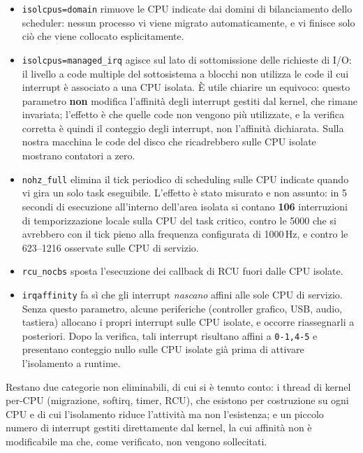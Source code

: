 \documentclass[11pt,a4paper]{article}
\begin{document}
\begin{itemize}
\item \texttt{isolcpus=domain} rimuove le CPU indicate dai domini di bilanciamento dello
scheduler: nessun processo vi viene migrato automaticamente, e vi finisce solo ci\`o che viene
collocato esplicitamente.

\item \texttt{isolcpus=managed\_irq} agisce sul lato di sottomissione delle richieste di I/O: il
livello a code multiple del sottosistema a blocchi non utilizza le code il cui interrupt \`e
associato a una CPU isolata. \`E utile chiarire un equivoco: questo parametro \textbf{non} modifica
l'affinit\`a degli interrupt gestiti dal kernel, che rimane invariata; l'effetto \`e che quelle
code non vengono pi\`u utilizzate, e la verifica corretta \`e quindi il conteggio degli interrupt,
non l'affinit\`a dichiarata. Sulla nostra macchina le code del disco che ricadrebbero sulle CPU
isolate mostrano contatori a zero.

\item \texttt{nohz\_full} elimina il tick periodico di scheduling sulle CPU indicate quando vi
gira un solo task eseguibile. L'effetto \`e stato misurato e non assunto: in 5 secondi di
esecuzione all'interno dell'area isolata si contano \textbf{106} interruzioni di temporizzazione
locale sulla CPU del task critico, contro le 5000 che si avrebbero con il tick pieno alla
frequenza configurata di 1000\,Hz, e contro le 623--1216 osservate sulle CPU di servizio.

\item \texttt{rcu\_nocbs} sposta l'esecuzione dei callback di RCU fuori dalle CPU isolate.

\item \texttt{irqaffinity} fa s\`i che gli interrupt \emph{nascano} affini alle sole CPU di
servizio. Senza questo parametro, alcune periferiche (controller grafico, USB, audio, tastiera)
allocano i propri interrupt sulle CPU isolate, e occorre riassegnarli a posteriori. Dopo la
verifica, tali interrupt risultano affini a \texttt{0-1,4-5} e presentano conteggio nullo sulle
CPU isolate gi\`a prima di attivare l'isolamento a runtime.
\end{itemize}

Restano due categorie non eliminabili, di cui si \`e tenuto conto: i thread di kernel per-CPU
(migrazione, softirq, timer, RCU), che esistono per costruzione su ogni CPU e di cui l'isolamento
riduce l'attivit\`a ma non l'esistenza; e un piccolo numero di interrupt gestiti direttamente dal
kernel, la cui affinit\`a non \`e modificabile ma che, come verificato, non vengono sollecitati.
\end{document}
